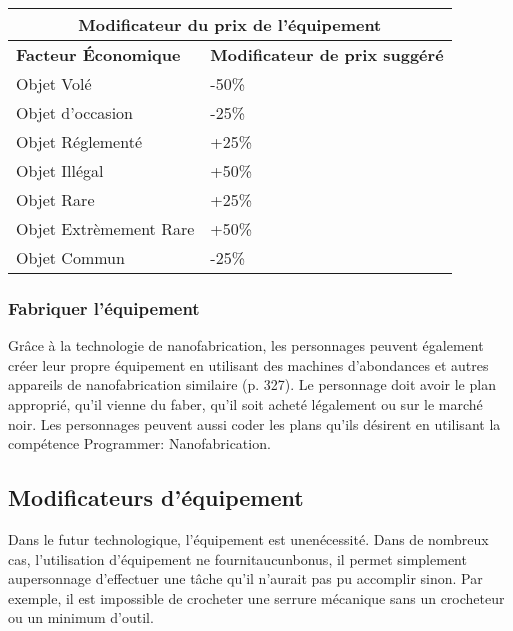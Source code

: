 \begin{table} \begin{tabular}{|l|l|} \hline

\multicolumn{2}{|c|}{\textbf{Modificateur du prix de l'équipement}}	\\ \hline

\textbf{Facteur Économique}	&\textbf{Modificateur de prix suggéré} \\ \hline

Objet Volé	&-50\% \\ \hline

Objet d'occasion	&-25\% \\ \hline

Objet Réglementé	&+25\% \\ \hline

Objet Illégal	&+50\% \\ \hline

Objet Rare	&+25\% \\ \hline

Objet Extrèmement Rare	&+50\% \\ \hline

Objet Commun	&-25\% \\ \hline

\end{tabular} \label{tab:gear-cost-modifiers} \end{table} 

\subsubsection{Fabriquer l'équipement} 

Grâce à la technologie de nanofabrication, les personnages peuvent également créer leur propre équipement en utilisant des machines d'abondances et autres appareils de nanofabrication similaire (p. 327). Le personnage doit avoir le plan approprié, qu'il vienne du faber, qu'il soit acheté légalement ou sur le marché noir. Les personnages peuvent aussi coder les plans qu'ils désirent en utilisant la compétence Programmer: Nanofabrication. 

\subsection{Modificateurs d'équipement} \label{sec:gear-modifiers} 

Dans le futur technologique, l'équipement est unenécessité. Dans de nombreux cas, l'utilisation d'équipement ne fournitaucunbonus, il permet simplement aupersonnage d'effectuer une tâche qu'il n'aurait pas pu accomplir sinon. Par exemple, il est impossible de crocheter une serrure mécanique sans un crocheteur ou un minimum d'outil. 

